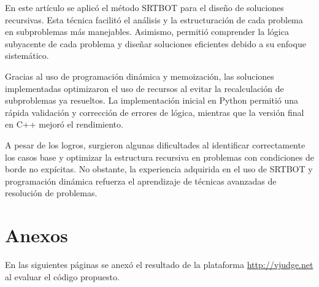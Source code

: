 \documentclass[a4paper, 12pt]{article}
\begin{document}

En este artículo se aplicó el método SRTBOT para el diseño de soluciones recursivas. Esta técnica facilitó el análisis y la estructuración de cada problema en subproblemas más manejables. Asimismo, permitió comprender la lógica subyacente de cada problema y diseñar soluciones eficientes debido a su enfoque sistemático.

Gracias al uso de programación dinámica y memoización, las soluciones implementadas optimizaron el uso de recursos al evitar la recalculación de subproblemas ya resueltos. La implementación inicial en Python permitió una rápida validación y corrección de errores de lógica, mientras que la versión final en C++ mejoró el rendimiento.

A pesar de los logros, surgieron algunas dificultades al identificar correctamente los casos base y optimizar la estructura recursiva en problemas con condiciones de borde no expícitas. No obstante, la experiencia adquirida en el uso de SRTBOT y programación dinámica refuerza el aprendizaje de técnicas avanzadas de resolución de problemas.

\printbibliography

\section{Anexos}

En las siguientes páginas se anexó el resultado de la plataforma \href{http://vjudge.net}{http://vjudge.net} al evaluar el código propuesto.
\end{document}
